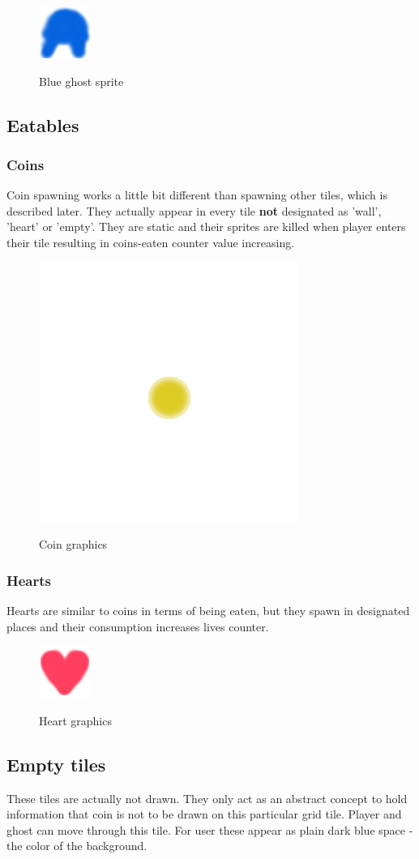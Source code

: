 \documentclass[11pt,a4paper,notitlepage]{report}
\newcommand{\dsubsection}[1]{\FloatBarrier \subsection{#1}}
\newenvironment{img}{
	\begin{center}
		\begin{figure}[H]
			\begin{center}
			
}{
	\end{center}
		\end{figure}
			\end{center}
}
\begin{document}
				 \begin{img}
				 	\includegraphics{images/blueghost}\\
				 	\caption{Blue ghost sprite}
				 \end{img}
			\dsubsection{Eatables}
				\subsubsection{Coins}
					\label{coins}
					Coin spawning works a little bit different than spawning other tiles, which is described later. They actually appear in every tile \textbf{not} designated as 'wall', 'heart' or 'empty'. They are static and their sprites are killed when player enters their tile resulting in coins-eaten counter value increasing.
					\begin{img}
						\includegraphics{images/coin}\\
						\caption{Coin graphics}
					\end{img}
				\subsubsection{Hearts}
					\label{hearts}
					Hearts are similar to coins in terms of being eaten, but they spawn in designated places and their consumption increases lives counter.
					\begin{img}
						\includegraphics{images/heart}\\
						\caption{Heart graphics}
					\end{img}
			\dsubsection{Empty tiles}
				These tiles are actually not drawn. They only act as an abstract concept to hold information that coin is not to be drawn on this particular grid tile. Player and ghost can move through this tile. For user these appear as plain dark blue space - the color of the background.
\end{document}
